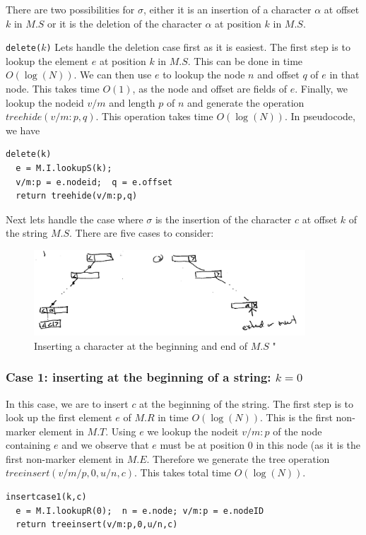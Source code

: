 \documentclass{amsart}
\begin{document}
There are two possibilities for $\sigma$, either it is an insertion of a character $\alpha$ at offset $k$ in $M.S$ or it is the deletion of the character $\alpha$ at position $k$ in $M.S$.  

 {{\tt delete($k$)}} 
Lets handle the deletion case first as it is easiest. The first step is to lookup the element $e$ at position $k$ in $M.S$. This can be done in time $O(\log(N))$.
We can then use $e$ to lookup the node $n$ and offset $q$ of $e$ in that node.
This takes time $O(1)$, as the node and offset are fields of $e$. Finally, we lookup the
nodeid $v/m$ and length $p$ of $n$ and generate the operation $treehide(v/m:p,q)$. This operation takes time $O(\log(N))$. In pseudocode, we have
\begin{verbatim}
delete(k)
  e = M.I.lookupS(k);
  v/m:p = e.nodeid;  q = e.offset
  return treehide(v/m:p,q)
\end{verbatim}

Next lets handle the case where $\sigma$ is the insertion of the character $c$
at offset $k$ of the string $M.S$.  There are five cases to consider:

\begin{figure}[h]
\centering
\includegraphics[width=4.0in]{insertAtFront002.jpg}
\caption{Inserting a character at the beginning and end of $M.S$ \label{fig:frontinsert}"}
\end{figure}

\subsubsection{Case 1: inserting at the beginning of a string: $k=0$}
In this case, we are to insert $c$ at the beginning of the string.
The first step is to look up the first element $e$ of $M.R$ in time $O(\log(N))$.
This is the first non-marker element in $M.T$. Using $e$ we lookup the
nodeit $v/m:p$ of the node containing $e$ and we observe that $e$ must be at position 0 in this node (as it is the first non-marker element in $M.E$. Therefore
we generate the tree operation $treeinsert(v/m/p,0,u/n,c)$. This takes total time $O(\log(N))$.
\begin{verbatim}
insertcase1(k,c)
  e = M.I.lookupR(0);  n = e.node; v/m:p = e.nodeID
  return treeinsert(v/m:p,0,u/n,c)
\end{verbatim}
\end{document}

